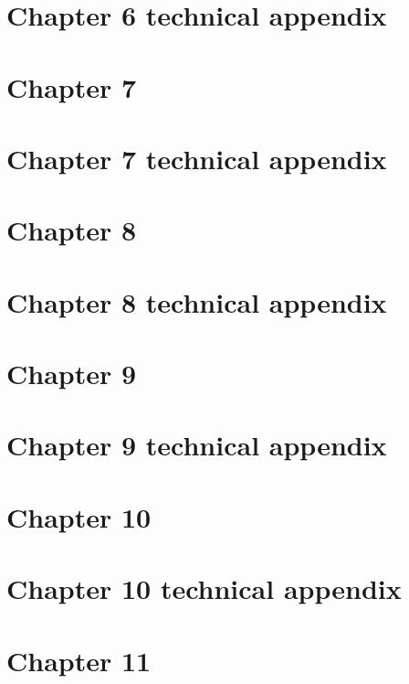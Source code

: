 \documentclass[10pt]{article}
\begin{document}
  \newpage
  \section*{Chapter 6 technical appendix}
  
  
  \newpage
  \section*{Chapter 7}
  
  
  \newpage
  \section*{Chapter 7 technical appendix}
  
  
  \newpage
  \section*{Chapter 8}
  
  
  \newpage
  \section*{Chapter 8 technical appendix}
  
  
  \newpage
  \section*{Chapter 9}
  
  
  \newpage
  \section*{Chapter 9 technical appendix}
  
  
  \newpage
  \section*{Chapter 10}
  
  
  \newpage
  \section*{Chapter 10 technical appendix}
    
  
  \newpage
  \section*{Chapter 11}
  
	  
\end{document}
